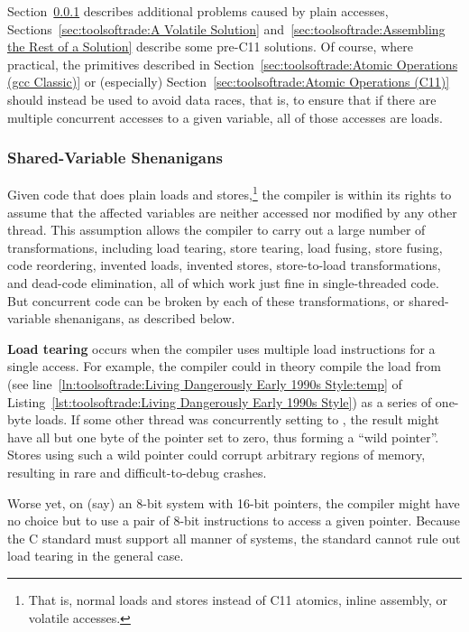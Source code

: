 Section~\ref{sec:toolsoftrade:Shared-Variable Shenanigans}
describes additional problems caused by plain accesses,
Sections~\ref{sec:toolsoftrade:A Volatile Solution}
and~\ref{sec:toolsoftrade:Assembling the Rest of a Solution}
describe some pre-C11 solutions.
Of course, where practical, the primitives described in
Section~\ref{sec:toolsoftrade:Atomic Operations (gcc Classic)}
or (especially)
Section~\ref{sec:toolsoftrade:Atomic Operations (C11)}
should instead be used to avoid data races, that is, to ensure
that if there are multiple concurrent accesses to a given
variable, all of those accesses are loads.

\subsubsection{Shared-Variable Shenanigans}
\label{sec:toolsoftrade:Shared-Variable Shenanigans}
%
Given code that does plain loads and stores,\footnote{
	That is, normal loads and stores instead of C11 atomics, inline
	assembly, or volatile accesses.}
the compiler is within
its rights to assume that the affected variables are neither accessed
nor modified by any other thread.
This assumption allows the compiler to carry out a large number of
transformations, including load tearing, store tearing,
load fusing, store fusing, code reordering, invented loads,
invented stores, store-to-load transformations, and dead-code elimination,
all of which work just fine in single-threaded code.
But concurrent code can be broken by each of these transformations,
or shared-variable shenanigans, as described below.

{\bf Load tearing} occurs when the compiler uses multiple load
instructions for a single access.
For example, the compiler could in theory compile the load from
 (see
line~\ref{ln:toolsoftrade:Living Dangerously Early 1990s Style:temp} of
Listing~\ref{lst:toolsoftrade:Living Dangerously Early 1990s Style})
as a series of one-byte loads.
If some other thread was concurrently setting  to
, the result might have all but one byte of the pointer
set to zero, thus forming a ``wild pointer''.
Stores using such a wild pointer could corrupt arbitrary
regions of memory, resulting in rare and difficult-to-debug crashes.

Worse yet, on (say) an 8-bit system with 16-bit pointers, the compiler
might have no choice but to use a pair of 8-bit instructions to access
a given pointer.
Because the C standard must support all manner of systems, the standard
cannot rule out load tearing in the general case.

